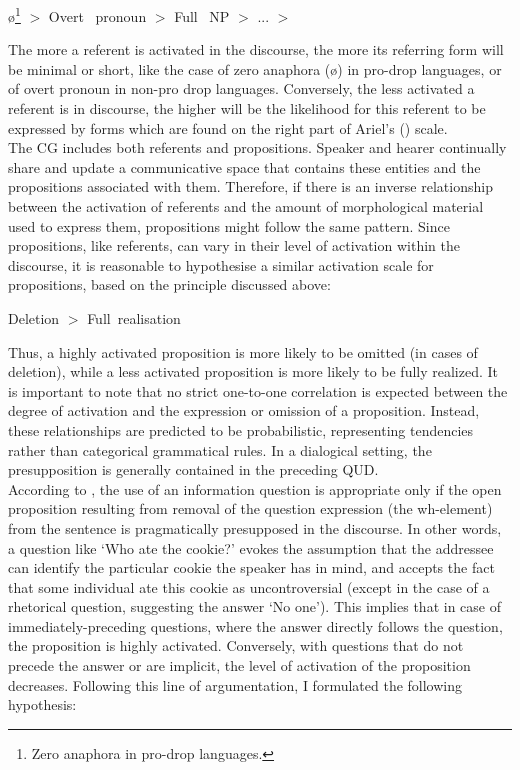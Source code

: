 \ea
 {\large  ø\footnote{Zero anaphora in pro-drop languages.} $>$  Overt \ pronoun $>$  Full \ NP $>$  ... $>$ }
  \z

The more a referent is activated in the discourse, the more its referring form will be minimal or short, like the case of zero anaphora (ø) in pro-drop languages, or of overt pronoun in non-pro drop languages. Conversely, the less activated a referent is in discourse, the higher will be the likelihood for this referent to be expressed by forms which are found on the right part of Ariel's (\citeyear{ariel2001accessibility}) scale.\\
The CG includes both referents and propositions. Speaker and hearer continually share and update a communicative space that contains these entities and the propositions associated with them. Therefore, if there is an inverse relationship between the activation of referents and the amount of morphological material used to express them, propositions might follow the same pattern. Since propositions, like referents, can vary in their level of activation within the discourse, it is reasonable to hypothesise a similar activation scale for propositions, based on the principle discussed above: 

\ea
  {\large Deletion $>$ Full\ realisation}
  \z

Thus, a highly activated proposition is more likely to be omitted (in cases of deletion), while a less activated proposition is more likely to be fully realized. It is important to note that no strict one-to-one correlation is expected between the degree of activation and the expression or omission of a proposition. Instead, these relationships are predicted to be probabilistic, representing tendencies rather than categorical grammatical rules.
In a dialogical setting, the presupposition is generally contained in the preceding QUD. \\
According to \textcite{lambrecht1996information}, the use of an information question is appropriate only if the open proposition resulting from removal of the question expression (the wh-element) from the sentence is pragmatically presupposed in the discourse. In other words, a question like `Who ate the cookie?' evokes the assumption that the addressee can identify the particular cookie the speaker has in mind, and accepts the fact that some individual ate this cookie as uncontroversial  (except in the case of a rhetorical  question, suggesting the answer `No one').
This implies that in case of immediately-preceding questions, where the answer directly follows the question, the proposition is highly activated. Conversely, with questions that do not precede the answer or are implicit, the level of activation of the proposition decreases. Following this line of argumentation, I formulated the following hypothesis:\\

